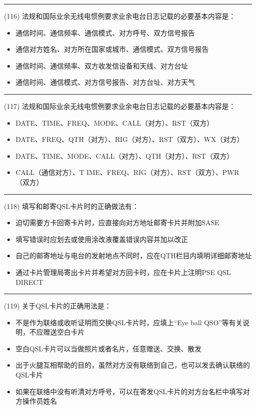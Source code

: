 \documentclass[twocolumn]{ctexart}  %
\begin{document}
\noindent\rule{0.5\textwidth}{1pt}
\heiti (116) 法规和国际业余无线电惯例要求业余电台日志记载的必要基本内容是： \songti {\color{gray} [LK0075] }
\begin{itemize}
	\item  通信时间、通信频率、通信模式、对方呼号、双方信号报告
	\item  通信对方姓名、对方所在国家或城市、通信模式、双方信号报告
	\item  通信时间、通信频率、双方收发信设备和天线、对方台址
	\item  通信时间、通信模式、对方信号报告、对方台址、对方天气
\end{itemize}


\noindent\rule{0.5\textwidth}{1pt}
\heiti (117) 法规和国际业余无线电惯例要求业余电台日志记载的必要基本内容是： \songti {\color{gray} [LK0076] }
\begin{itemize}
	\item  DATE、TIME、FREQ、MODE、CALL（对方）、RST（双方）
	\item  DATE、FREQ、QTH（对方）、RIG（对方）、RST（双方）、WX（对方）
	\item  DATE、TIME、MODE、CALL（对方）、QTH（对方）、RST（双方）
	\item  CALL（通信对方）、T IME、FREQ、RIG（对方）、RST（双方）、PWR（双方）
\end{itemize}


\noindent\rule{0.5\textwidth}{1pt}
\heiti (118) 填写和邮寄QSL卡片时的正确做法有： \songti {\color{gray} [LK1011] }
\begin{itemize}
	\item  迫切需要方卡回寄卡片时，应直接向对方地址邮寄卡片并附加SASE
	\item  填写错误时应划去或使用涂改液覆盖错误内容并加以改正
	\item  自己的邮寄地址与电台的发射地点不同时，应在QTH栏目内填明详细邮寄地址
	\item  通过卡片管理局寄出卡片并希望对方回卡时，应在卡片上注明PSE QSL DIRECT
\end{itemize}


\noindent\rule{0.5\textwidth}{1pt}
\heiti (119) 关于QSL卡片的正确用法是： \songti {\color{gray} [LK1042] }
\begin{itemize}
	\item  不是作为联络或收听证明而交换QSL卡片时，应填上“Eye ball QSO”等有关说明，不应赠送空白卡片
	\item  空白QSL卡片可以当做照片或者名片，任意赠送、交换、散发
	\item  出于火腿互相帮助的目的，虽然对方没有联络到自己，也可以发去确认联络的QSL卡片
	\item  如果在联络中没有听清对方呼号，可以在寄发QSL卡片的对方台名栏中填写对方操作员姓名
\end{itemize}
\end{document}
